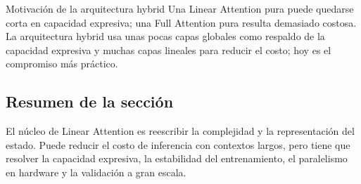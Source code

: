 \begin{importantbox}{Motivación de la arquitectura hybrid}
Una Linear Attention pura puede quedarse corta en capacidad expresiva; una Full Attention pura resulta demasiado costosa. La arquitectura hybrid usa unas pocas capas globales como respaldo de la capacidad expresiva y muchas capas lineales para reducir el costo; hoy es el compromiso más práctico.
\end{importantbox}

\subsection{Resumen de la sección}

El núcleo de Linear Attention es reescribir la complejidad y la representación del estado. Puede reducir el costo de inferencia con contextos largos, pero tiene que resolver la capacidad expresiva, la estabilidad del entrenamiento, el paralelismo en hardware y la validación a gran escala.
